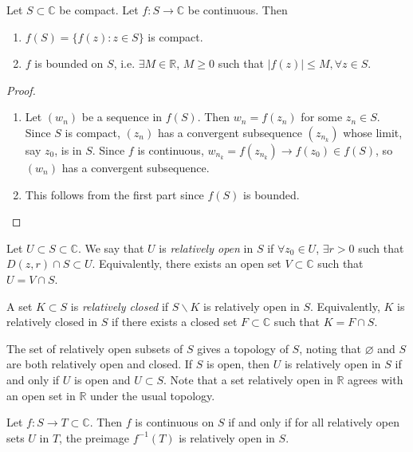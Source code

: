 \begin{theorem}
  Let $S \subset \mathbb{C}$ be compact. Let $f : S \to \mathbb{C}$ be
  continuous. Then
  \begin{enumerate}
    \item{
      $f(S) = \{ f(z) : z \in S \}$ is compact.
    }
    \item{
      $f$ is bounded on $S$, i.e. $\exists M \in \mathbb{R}$,
      $M \geq 0$ such that $|f(z)| \leq M, \forall z \in S$.
    }
  \end{enumerate}
\end{theorem}

\begin{proof}
  \begin{enumerate}
    \item{
      Let $(w_n)$ be a sequence in $f(S)$. Then $w_n = f(z_n)$
      for some $z_n \in S$. Since $S$ is compact, $(z_n)$ has a convergent
      subsequence $(z_{n_k})$ whose limit, say $z_0$, is in $S$. Since
      $f$ is continuous, $w_{n_k} = f(z_{n_k}) \to f(z_0) \in f(S)$,
      so $(w_n)$ has a convergent subsequence.
    }
    \item{
      This follows from the first part since $f(S)$ is bounded.
    }
  \end{enumerate}
\end{proof}

\begin{defn}
  Let $U \subset S \subset \mathbb{C}$. We say that $U$ is
  \emph{relatively open} in $S$ if $\forall z_0 \in U$,
  $\exists r > 0$ such that $D(z, r) \cap S \subset U$.
  Equivalently, there exists an open set $V \subset \mathbb{C}$
  such that $U = V \cap S$.

  A set $K \subset S$ is \emph{relatively closed} if
  $S \backslash K$ is relatively open in $S$.
  Equivalently, $K$ is relatively closed in $S$ if there exists a closed set
  $F \subset \mathbb{C}$ such that $K = F \cap S$.

\end{defn}

The set of relatively open subsets of $S$ gives a topology of $S$,
noting that $\varnothing$ and $S$ are both relatively open and closed.
If $S$ is open, then $U$ is relatively open in $S$ if and only if $U$
is open and $U \subset S$. Note that a set relatively open in
$\mathbb{R}$ agrees with an open set in $\mathbb{R}$ under the usual
topology.

\begin{theorem}
  Let $f : S \to T \subset \mathbb{C}$. Then $f$ is continuous on
  $S$ if and only if for all relatively open sets $U$ in $T$,
  the preimage $f^{-1}(T)$ is relatively open in $S$.
\end{theorem}

